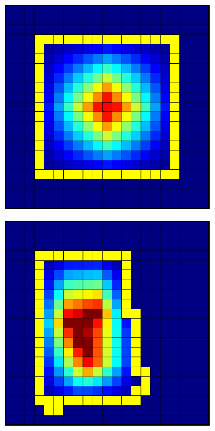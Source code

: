 \begin{figure}[htbp]
\begin{subfigure}[t]{0.3\textwidth}
  \end{subfigure}
  \par\bigskip
  \begin{subfigure}[t]{0.3\textwidth}
    \centerline{\includegraphics[width=0.9\linewidth]{figs/square/square_cart_struct_cell_conv}}
  \end{subfigure}
  \hfill
  \begin{subfigure}[t]{0.3\textwidth}
    \centerline{\includegraphics[width=0.9\linewidth]{figs/square/square_cart_metis_cell_conv}}

\end{subfigure}
\end{figure}

